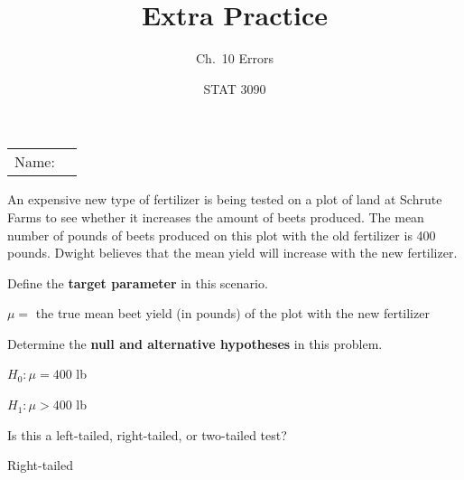 \documentclass[noanswers]{exam}
\title{Extra Practice}
\author{Ch.\ 10 Errors}
\date{STAT 3090}
\begin{document}
\noindent\begin{tabular}{@{}p{.3in}p{3in}@{}}
Name: & \hrulefill
\end{tabular}

\vspace{4mm}

\noindent An expensive new type of fertilizer is being tested on a plot of land at Schrute Farms to see whether it increases the amount of beets produced. The mean number of pounds of beets produced on this plot with the old fertilizer is 400 pounds. Dwight believes that the mean yield will increase with the new fertilizer.

\begin{questions} 

\vspace{1mm}

\question Define the \textbf{target parameter} in this scenario.

\begin{solution}[\stretch{1}]

\vspace{1mm}

$\mu=$ the true mean beet yield (in pounds) of the plot with the new fertilizer

\vspace{1mm}

\end{solution}

\question Determine the \textbf{null and alternative hypotheses} in this problem.

\begin{solution}[\stretch{1}]

\vspace{1mm}

$H_0:\mu=400$ lb

$H_1:\mu>400$ lb

\vspace{1mm}

\end{solution}

\question Is this a left-tailed, right-tailed, or two-tailed test?

\begin{solution}[\stretch{1}]

\vspace{1mm}

Right-tailed

\vspace{1mm}

\end{solution}


\end{questions}
\end{document}
